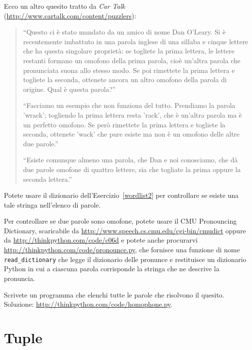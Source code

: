 \documentclass[10pt]{book}
\begin{document}
\vspace{0.2in}
\begin{exercise}

Ecco un altro quesito tratto da {\em Car Talk} (\url{http://www.cartalk.com/content/puzzlers}):

\begin{quote}
``Questo ci è stato mandato da un amico di nome Dan O'Leary. Si è recentemente imbattuto in una parola inglese di una sillaba e cinque lettere che ha questa singolare proprietà: se togliete la prima lettera, le lettere restanti formano un omofono della prima parola, cioè un'altra parola che pronunciata suona allo stesso modo. Se poi rimettete la prima lettera e togliete la seconda, ottenete ancora un altro omofono della parola di origine. Qual è questa parola?''

``Facciamo un esempio che non funziona del tutto. Prendiamo la parola 'wrack'; togliendo la prima lettera resta 'rack', che è un'altra parola ma è un perfetto omofono. Se però rimettete la prima lettera e togliete la seconda, ottenete 'wack' che pure esiste ma non è un omofono delle altre due parole.''

``Esiste comunque almeno una parola, che Dan e noi conosciamo, che dà due parole omofone di quattro lettere, sia che togliate la prima oppure la seconda lettera.''
\end{quote}

Potete usare il dizionario dell'Esercizio~\ref{wordlist2} per controllare se esiste una tale stringa nell'elenco di parole.

Per controllare se due parole sono omofone, potete usare il CMU Pronouncing Dictionary, scaricabile da
\url{http://www.speech.cs.cmu.edu/cgi-bin/cmudict} oppure da
\url{http://thinkpython.com/code/c06d} e potete anche procurarvi
\url{http://thinkpython.com/code/pronounce.py}, che fornisce una funzione di nome \verb"read_dictionary" che legge il dizionario delle pronunce e restituisce un dizionario Python in cui a ciascuna parola corrisponde la stringa che ne descrive la pronuncia.

Scrivete un programma che elenchi tutte le parole che risolvono il quesito. Soluzione: \url{http://thinkpython.com/code/homophone.py}.

\end{exercise}



\chapter{Tuple}
\label{tuplechap}
\end{document}
